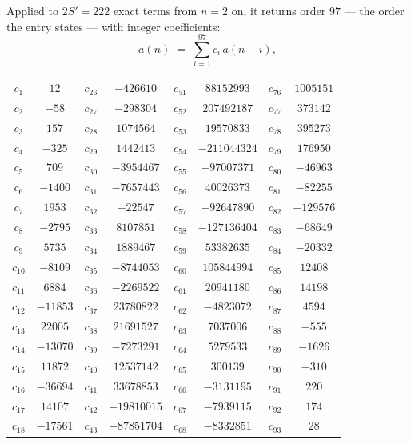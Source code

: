 \documentclass[11pt,a4paper]{article}
\theoremstyle{plain}
\theoremstyle{definition}
\begin{document}
Applied to $2S'=222$ exact terms from $n=2$ on, it returns order $97$ --- the
order the entry states --- with integer coefficients:
\[
a(n)\;=\;\sum_{i=1}^{97}c_i\,a(n-i),
\]
\begin{center}\small
\begin{tabular}{cccccccc}
$c_{1}$ & $12$ & $c_{26}$ & $-426610$ & $c_{51}$ & $88152993$ & $c_{76}$ & $1005151$ \\
$c_{2}$ & $-58$ & $c_{27}$ & $-298304$ & $c_{52}$ & $207492187$ & $c_{77}$ & $373142$ \\
$c_{3}$ & $157$ & $c_{28}$ & $1074564$ & $c_{53}$ & $19570833$ & $c_{78}$ & $395273$ \\
$c_{4}$ & $-325$ & $c_{29}$ & $1442413$ & $c_{54}$ & $-211044324$ & $c_{79}$ & $176950$ \\
$c_{5}$ & $709$ & $c_{30}$ & $-3954467$ & $c_{55}$ & $-97007371$ & $c_{80}$ & $-46963$ \\
$c_{6}$ & $-1400$ & $c_{31}$ & $-7657443$ & $c_{56}$ & $40026373$ & $c_{81}$ & $-82255$ \\
$c_{7}$ & $1953$ & $c_{32}$ & $-22547$ & $c_{57}$ & $-92647890$ & $c_{82}$ & $-129576$ \\
$c_{8}$ & $-2795$ & $c_{33}$ & $8107851$ & $c_{58}$ & $-127136404$ & $c_{83}$ & $-68649$ \\
$c_{9}$ & $5735$ & $c_{34}$ & $1889467$ & $c_{59}$ & $53382635$ & $c_{84}$ & $-20332$ \\
$c_{10}$ & $-8109$ & $c_{35}$ & $-8744053$ & $c_{60}$ & $105844994$ & $c_{85}$ & $12408$ \\
$c_{11}$ & $6884$ & $c_{36}$ & $-2269522$ & $c_{61}$ & $20941180$ & $c_{86}$ & $14198$ \\
$c_{12}$ & $-11853$ & $c_{37}$ & $23780822$ & $c_{62}$ & $-4823072$ & $c_{87}$ & $4594$ \\
$c_{13}$ & $22005$ & $c_{38}$ & $21691527$ & $c_{63}$ & $7037006$ & $c_{88}$ & $-555$ \\
$c_{14}$ & $-13070$ & $c_{39}$ & $-7273291$ & $c_{64}$ & $5279533$ & $c_{89}$ & $-1626$ \\
$c_{15}$ & $11872$ & $c_{40}$ & $12537142$ & $c_{65}$ & $300139$ & $c_{90}$ & $-310$ \\
$c_{16}$ & $-36694$ & $c_{41}$ & $33678853$ & $c_{66}$ & $-3131195$ & $c_{91}$ & $220$ \\
$c_{17}$ & $14107$ & $c_{42}$ & $-19810015$ & $c_{67}$ & $-7939115$ & $c_{92}$ & $174$ \\
$c_{18}$ & $-17561$ & $c_{43}$ & $-87851704$ & $c_{68}$ & $-8332851$ & $c_{93}$ & $28$ \\

\end{tabular}
\end{center}
\end{document}
